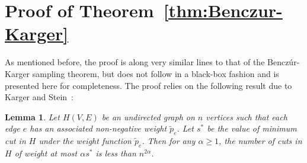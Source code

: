 \documentclass[11pt]{article}
\newtheorem{lemma}[theorem]{Lemma}
\begin{document}
\section{Proof of Theorem~\ref{thm:Benczur-Karger}}
\label{append:bk}
As mentioned before, the proof is along very similar lines to that of the
Bencz\'{u}r-Karger sampling theorem, but does not follow in a black-box fashion
and is presented here for completeness. The proof relies on the following
result due to Karger and Stein~\cite{kargerstein96}:
\begin{lemma}
\label{lem:karger}
Let $H(V,E)$ be an undirected graph on $n$ vertices such that each edge $e$ has an associated
non-negative weight $\tilde{p}_e$. Let $s^*$ be the value of minimum cut in $H$
under the weight function $\tilde{p}_e$. Then for any $\alpha \geq 1$, the number of cuts in $H$
of weight at most $\alpha s^*$ is less than $n^{2\alpha}$.
\end{lemma}
\end{document}
